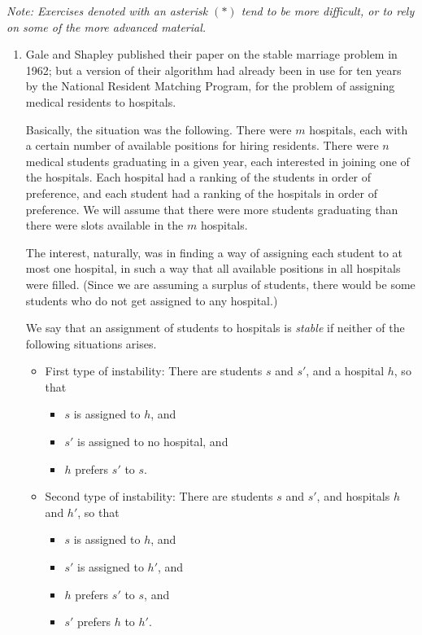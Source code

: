 \documentclass[12pt]{article}
\begin{document}
{\em Note: Exercises denoted with an asterisk $(\ast)$
tend to be more difficult, or to rely on some of the
more advanced material.}

\begin{enumerate}

\def\A{{\cal A}}
\def\D{{\cal D}}


\item

Gale and Shapley published their paper on the
stable marriage problem in 1962; but
a version of their algorithm had already been in use for ten years
by the National Resident Matching Program, for the problem of
assigning medical residents to hospitals.

Basically, the situation was the following.
There were $m$ hospitals,
each with a certain number of available positions for hiring residents.
There were $n$ medical students
graduating in a given year,
each interested in joining one of the hospitals.
Each hospital had a ranking of the students in order of
preference, and each student had a ranking of the hospitals
in order of preference.
We will assume that there were more students graduating
than there were slots available in the $m$ hospitals.

The interest, naturally, was in finding a way of
assigning each student to at most one hospital,
in such a way that all available
positions in all hospitals were filled.
(Since we are assuming a surplus of students,
there would be some students who do not get assigned to any hospital.)

We say that an assignment of students to hospitals is {\em stable} if
neither of the following situations arises.
\begin{itemize}
\item First type of instability:
There are students $s$ and $s'$, and a hospital $h$, so that
\begin{itemize}
\item $s$ is assigned to $h$, and
\item $s'$ is assigned to no hospital, and
\item $h$ prefers $s'$ to $s$.
\end{itemize}
\item Second type of instability:
There are students $s$ and $s'$, and hospitals $h$ and $h'$, so that
\begin{itemize}
\item $s$ is assigned to $h$, and
\item $s'$ is assigned to $h'$, and
\item $h$ prefers $s'$ to $s$, and
\item $s'$ prefers $h$ to $h'$.
\end{itemize}
\end{itemize}


\end{enumerate}
\end{document}

